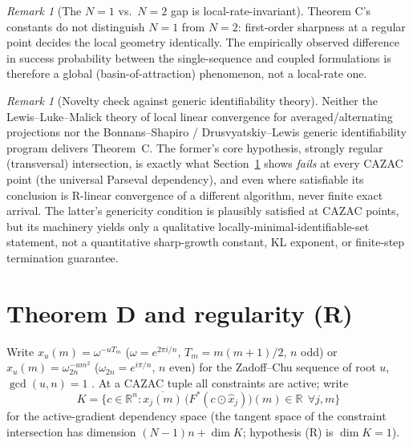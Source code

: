 \documentclass[11pt]{article}
\theoremstyle{plain}
\theoremstyle{definition}
\theoremstyle{remark}
\newtheorem{remark}[theorem]{Remark}
\newcommand{\R}{\mathbb R}
\begin{document}
\begin{remark}[The $N=1$ vs.\ $N=2$ gap is local-rate-invariant]
Theorem C's constants do not distinguish $N=1$ from $N=2$: first-order
sharpness at a regular point decides the local geometry identically. The
empirically observed difference in success probability between the
single-sequence and coupled formulations is therefore a global
(basin-of-attraction) phenomenon, not a local-rate one.
\end{remark}

\begin{remark}[Novelty check against generic identifiability theory]
Neither the Lewis--Luke--Malick theory of local linear convergence for
averaged/alternating projections \cite{LLM09} nor the Bonnans--Shapiro /
Drusvyatskiy--Lewis generic identifiability program \cite{DL12} delivers
Theorem~C. The former's core hypothesis, strongly regular (transversal)
intersection, is exactly what Section~\ref{sec:zc} shows \emph{fails} at
every CAZAC point (the universal Parseval dependency), and even where
satisfiable its conclusion is R-linear convergence of a different
algorithm, never finite exact arrival. The latter's genericity condition is
plausibly satisfied at CAZAC points, but its machinery yields only a
qualitative locally-minimal-identifiable-set statement, not a quantitative
sharp-growth constant, KL exponent, or finite-step termination guarantee.
\end{remark}

\section{Theorem D and regularity (R)}\label{sec:zc}

Write $x_u(m)=\omega^{-uT_m}$ ($\omega=e^{2\pi i/n}$, $T_m=m(m+1)/2$, $n$
odd) or $x_u(m)=\omega_{2n}^{-um^2}$ ($\omega_{2n}=e^{i\pi/n}$, $n$ even)
for the Zadoff--Chu sequence of root $u$, $\gcd(u,n)=1$ \cite{Chu72}. At a
CAZAC tuple all constraints are active; write
$$K=\{c\in\R^n: \overline{x_j(m)}\,\bigl(F^*(c\odot\widehat x_j)\bigr)(m)\in\R\ \ \forall j,m\}$$
for the active-gradient dependency space (the tangent space of the
constraint intersection has dimension $(N-1)n+\dim K$; hypothesis (R) is
$\dim K=1$).
\end{document}
